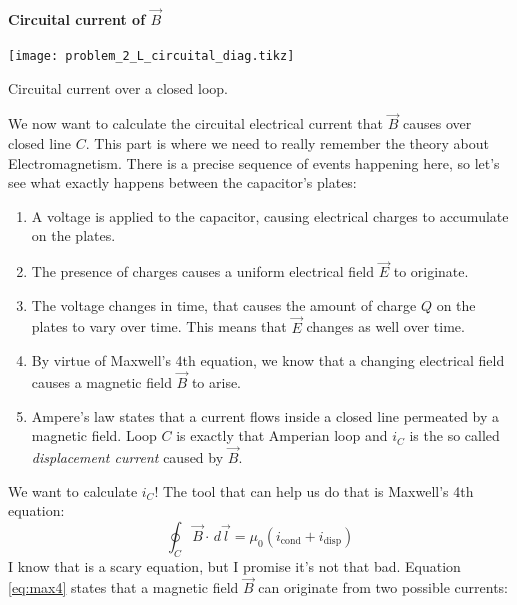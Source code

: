 \paragraph[Problem 4]{Circuital current of $\vec{B}$}
\label{par:subp4}
%
\begin{marginfigure}
    \texttt{[image: problem\_2\_L\_circuital\_diag.tikz]}
    \caption[Circuital current over a closed loop.]{Circuital current over a closed loop.}%
    \label{fig:circuital}%
\end{marginfigure}
%
We now want to calculate the circuital electrical current that $\vec{B}$ causes
over closed line $C$. This part is where we need to really remember the theory about
Electromagnetism. There is a precise sequence of events happening here, so let's
see what exactly happens between the capacitor's plates:
\begin{enumerate}
    \item A voltage is applied to the capacitor, causing electrical charges to accumulate on the
        plates.
    \item The presence of charges causes a uniform electrical field $\vec{E}$ to
        originate.
    \item The voltage changes in time, that causes the amount of charge $Q$ on the plates to
        vary over time. This means that $\vec{E}$ changes as well over time.
    \item By virtue of Maxwell's 4th equation, we know that a changing electrical field
        causes a magnetic field $\vec{B}$ to arise.
    \item Ampere's law states that a current flows inside a closed
        line permeated by a magnetic field.
        Loop $C$ is exactly that Amperian loop and $i_C$ is the so called
        \textit{displacement current} caused by $\vec{B}$.
\end{enumerate}
We want to
calculate $i_C$!
The tool that can help us do that is Maxwell's 4th equation:
\begin{equation}
\label{eq:max4}
    \oint_C \vec{B} \cdot \,d \vec{l} = \mu_0 (i_{\text{cond}} + i_{\text{disp}})
\end{equation}
I know that is a scary equation, but I promise it's not that bad.
Equation \ref{eq:max4} states that
a magnetic field $\vec{B}$ can originate from two possible currents:
